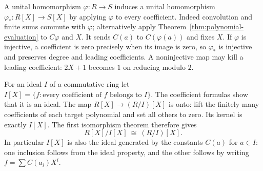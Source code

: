 A unital homomorphism $\varphi:R\to S$ induces a unital homomorphism
$\varphi_*:R[X]\to S[X]$ by applying $\varphi$ to every coefficient.
Indeed convolution and finite sums commute with $\varphi$; alternatively
apply Theorem~\ref{thm:polynomial-evaluation} to $C\varphi$ and $X$.
It sends $C(a)$ to $C(\varphi(a))$ and fixes $X$.
If $\varphi$ is injective, a coefficient is zero precisely when its
image is zero, so $\varphi_*$ is injective and preserves degree and
leading coefficients. A noninjective map may kill a leading
coefficient: $2X+1$ becomes $1$ on reducing modulo $2$.

For an ideal $I$ of a commutative ring let
$I[X]=\{f:\text{every coefficient of }f\text{ belongs to }I\}$.
The coefficient formulas show that it is an ideal. The map
$R[X]\to(R/I)[X]$ is onto: lift the finitely many coefficients of
each target polynomial and set all others to zero. Its kernel is
exactly $I[X]$. The first isomorphism theorem therefore gives
\begin{equation}\label{eq:polynomial-coefficient-quotient}
 R[X]/I[X]\ \cong\ (R/I)[X].
\end{equation}
In particular $I[X]$ is also the ideal generated by the constants
$C(a)$ for $a\in I$: one inclusion follows from the ideal property,
and the other follows by writing $f=\sum C(a_i)X^i$.


